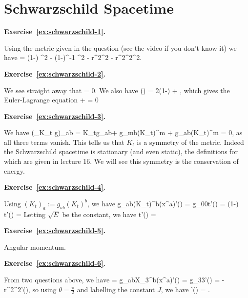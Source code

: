 \section{Schwarzschild Spacetime}

\noindent\textbf{Exercise~\ref{ex:schwarzschild-1}.}\label{sol:schwarzschild-1}

Using the metric given in the question (see the video if you don't know it) we have
\bse
    \cL = \bigg(1-\bigg) ^2 - \bigg(1-\bigg)^{-1} ^2 - r^2\dot{\theta}^2 - r^2\sin^2\theta \dot{\varphi}^2.
\ese

\bigskip
\noindent\textbf{Exercise~\ref{ex:schwarzschild-2}.}\label{sol:schwarzschild-2}

We see straight away that
\bse
     = 0.
\ese
We also have
\bse
    \bigg(\bigg) = 2\bigg(1-\bigg)  + ,
\ese
which gives the Euler-Lagrange equation
\bse
     +  = 0
\ese

\bigskip
\noindent\textbf{Exercise~\ref{ex:schwarzschild-3}.}\label{sol:schwarzschild-3}

We have
\bse
    (\cL_{K_t} g)_{ab} = K_t\la g_{ab}\ra + g_{mb}(K_t)^m + g_{ab}(K_t)^m = 0,
\ese
as all three terms vanish. This tells us that $K_t$ is a symmetry of the metric. Indeed the Schwarzschild spacetime is stationary (and even static), the definitions for which are given in lecture 16. We will see this symmetry is the conservation of energy.

\bigskip
\noindent\textbf{Exercise~\ref{ex:schwarzschild-4}.}\label{sol:schwarzschild-4}

Using $(K_t)_a := g_{ab}(K_t)^b$, we have
\bse
    g_{ab}(K_t)^b(x^a)'(\lambda) = g_{00}t'(\lambda) = \bigg(1-\bigg) t'(\lambda) = 
\ese
Letting $\sqrt{E}$ be the constant, we have
\bse
    t'(\lambda) = 
\ese

\bigskip
\noindent\textbf{Exercise~\ref{ex:schwarzschild-5}.}\label{sol:schwarzschild-5}

Angular momentum.

\bigskip
\noindent\textbf{Exercise~\ref{ex:schwarzschild-6}.}\label{sol:schwarzschild-6}

From two questions above, we have
\bse
     = g_{ab}X_3^b(x^a)'(\lambda) = g_{33}\varphi'(\lambda) = -r^2\sin^2\theta\varphi'(\lambda),
\ese
so using $\theta=\frac{\pi}{2}$ and labelling the constant $J$, we have
\bse
    \varphi'(\lambda) = .
\ese

